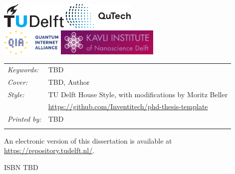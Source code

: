 \begin{titlepage}
\vfill

\begin{center}
\noindent
\includegraphics[height=0.5in]{figures/logos/tudelft.pdf}
\hfill
\includegraphics[height=0.5in]{figures/logos/qutech.pdf}
\hfill
\\ \vspace{2\baselineskip}
\includegraphics[height=0.5in]{figures/logos/qia.pdf}
\hfill
\includegraphics[height=0.5in]{figures/logos/kavli.pdf}
\hfill
\end{center}

\vfill

\noindent
\begin{tabular}{@{}p{}@{}p{}}
    \textit{Keywords:} & TBD \\[\medskipamount]
    \textit{Cover:} & TBD, Author \\[\medskipamount]
    \textit{Style:} & TU Delft House Style, with modifications by Moritz Beller \\
    & \url{https://github.com/Inventitech/phd-thesis-template} \\[\medskipamount]
    \textit{Printed by:} & TBD \\
    & \\[\medskipamount]
\end{tabular}

\vspace{\bigskipamount}



\noindent
An electronic version of this dissertation is available at \\
\url{https://repository.tudelft.nl/}.

\medskip
\noindent
ISBN TBD

\end{titlepage}
